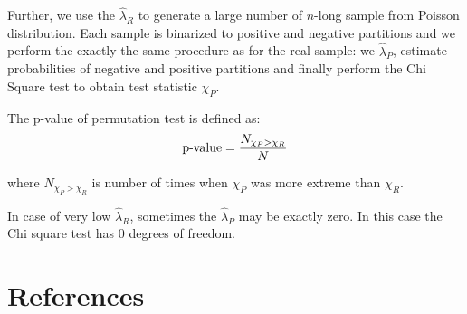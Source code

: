 \documentclass[review]{elsarticle}
\begin{document}
Further, we use the $\hat\lambda_R$ to generate a large number of $n$-long sample from Poisson distribution. Each sample is binarized to positive and negative partitions and we perform the exactly the same procedure as for the real sample: we $\hat\lambda_P$, estimate probabilities of negative and positive partitions and finally perform the Chi Square test to obtain test statistic $\chi_P$.

The p-value of permutation test is defined as:
\begin{equation}   
\textnormal{p-value} = \frac{N_{\chi_P > \chi_R}}{N}
\end{equation}

where $N_{\chi_P > \chi_R}$ is number of times when $\chi_P$ was more extreme than $\chi_R$.

In case of very low $\hat\lambda_R$, sometimes the $\hat\lambda_P$ may be exactly zero. In this case the Chi square test has 0 degrees of freedom. 


\section*{References}


\end{document}
